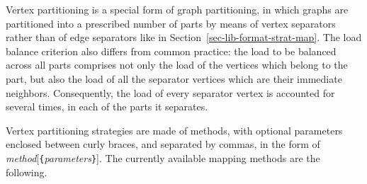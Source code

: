 Vertex partitioning is a special form of graph partitioning, in which
graphs are partitioned into a prescribed number of parts by means of
vertex separators rather than of edge separators like in
Section~\ref{sec-lib-format-strat-map}. The load balance criterion also
differs from common practice: the load to be balanced across all parts
comprises not only the load of the vertices which belong to the part,
but also the load of all the separator vertices which are their
immediate neighbors. Consequently, the load of every separator vertex
is accounted for several times, in each of the parts it separates.

Vertex partitioning strategies are made of methods, with optional
parameters enclosed between curly braces, and separated by commas, in
the form of {\it method\/}{[{\tt \{}{\it parameters\/}{\tt \}}]}\enspace.
The currently available mapping methods are the following.

